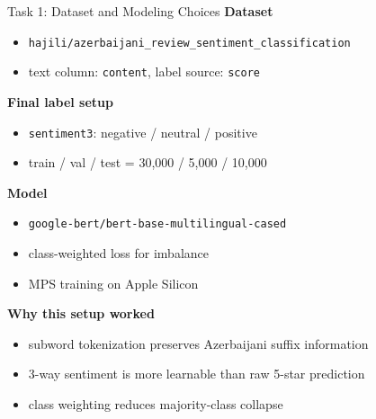 \documentclass{beamer}
\begin{document}
\begin{frame}{Task 1: Dataset and Modeling Choices}
\small
\textbf{Dataset}
\begin{itemize}
  \item \texttt{hajili/azerbaijani\_review\_sentiment\_classification}
  \item text column: \texttt{content}, label source: \texttt{score}
\end{itemize}

\vspace{0.3em}
\textbf{Final label setup}
\begin{itemize}
  \item \texttt{sentiment3}: negative / neutral / positive
  \item train / val / test = 30,000 / 5,000 / 10,000
\end{itemize}

\vspace{0.3em}
\textbf{Model}
\begin{itemize}
  \item \texttt{google-bert/bert-base-multilingual-cased}
  \item class-weighted loss for imbalance
  \item MPS training on Apple Silicon
\end{itemize}

\vspace{0.3em}
\textbf{Why this setup worked}
\begin{itemize}
  \item subword tokenization preserves Azerbaijani suffix information
  \item 3-way sentiment is more learnable than raw 5-star prediction
  \item class weighting reduces majority-class collapse
\end{itemize}
\end{frame}
\end{document}
